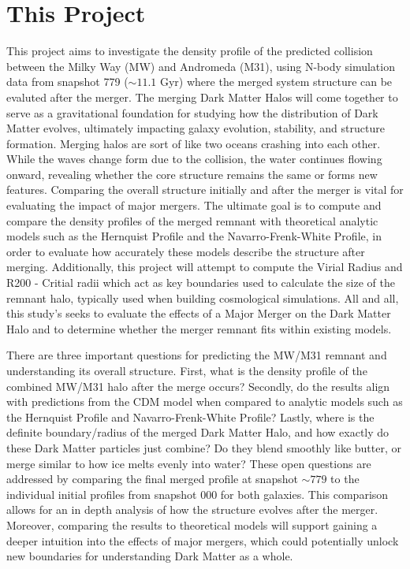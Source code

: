 \documentclass[fleqn,usenatbib]{mnras}
\begin{document}
\section{This Project}
This project aims to investigate the density profile of the predicted collision between the Milky Way (MW) and Andromeda (M31), using N-body simulation data from snapshot 779 ($\sim 11.1$ Gyr) where the merged system structure can be evaluted after the merger. The merging Dark Matter Halos will come together to serve as a gravitational foundation for studying how the distribution of Dark Matter evolves, ultimately impacting galaxy evolution, stability, and structure formation. Merging halos are sort of like two oceans crashing into each other. While the waves change form due to the collision, the water continues flowing onward, revealing whether the core structure remains the same or forms new features. Comparing the overall structure initially and after the merger is vital for evaluating the impact of major mergers. The ultimate goal is to compute and compare the density profiles of the merged remnant with theoretical analytic models such as the Hernquist Profile and the Navarro-Frenk-White Profile, in order to evaluate how accurately these models describe the structure after merging. Additionally, this project will attempt to compute the Virial Radius and R200 - Critial radii which act as key boundaries used to calculate the size of the remnant halo, typically used when building cosmological simulations. All and all, this study's seeks to evaluate the effects of a Major Merger on the Dark Matter Halo and to determine whether the merger remnant fits within existing models.  

There are three important questions for predicting the MW/M31 remnant and understanding its overall structure. First, what is the density profile of the combined MW/M31 halo after the merge occurs? Secondly, do the results align with predictions from the CDM model when compared to analytic models such as the Hernquist Profile and Navarro-Frenk-White Profile? Lastly, where is the definite boundary/radius of the merged Dark Matter Halo, and how exactly do these Dark Matter particles just combine? Do they blend smoothly like butter, or merge similar to how ice melts evenly into water? These open questions are addressed by comparing the final merged profile at snapshot $\sim 779$ to the individual initial profiles from snapshot 000 for both galaxies. This comparison allows for an in depth analysis of how the structure evolves after the merger. Moreover, comparing the results to theoretical models will support gaining a deeper intuition into the effects of major mergers, which could potentially unlock new boundaries for understanding Dark Matter as a whole. 
\end{document}
